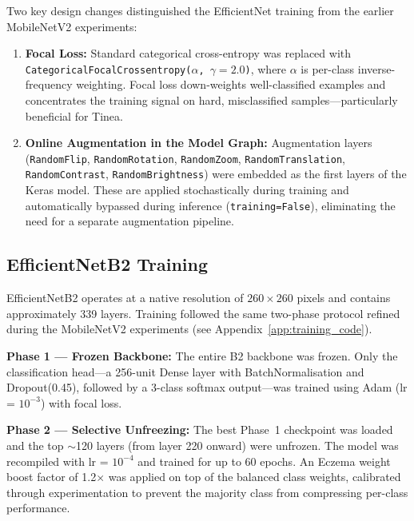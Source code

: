 Two key design changes distinguished the EfficientNet training from the earlier MobileNetV2 experiments:

\begin{enumerate}
    \item \textbf{Focal Loss:} Standard categorical cross-entropy was replaced with \texttt{CategoricalFocalCrossentropy($\alpha$, $\gamma=2.0$)}, where $\alpha$ is per-class inverse-frequency weighting. Focal loss down-weights well-classified examples and concentrates the training signal on hard, misclassified samples---particularly beneficial for Tinea.

    \item \textbf{Online Augmentation in the Model Graph:} Augmentation layers (\texttt{RandomFlip}, \texttt{RandomRotation}, \texttt{RandomZoom}, \texttt{RandomTranslation}, \texttt{RandomContrast}, \texttt{RandomBrightness}) were embedded as the first layers of the Keras model. These are applied stochastically during training and automatically bypassed during inference (\texttt{training=False}), eliminating the need for a separate augmentation pipeline.
\end{enumerate}


\subsection{EfficientNetB2 Training}
\label{sec:b2_training}

EfficientNetB2 operates at a native resolution of $260 \times 260$ pixels and contains approximately 339 layers. Training followed the same two-phase protocol refined during the MobileNetV2 experiments (see Appendix~\ref{app:training_code}).

\textbf{Phase 1 --- Frozen Backbone:} The entire B2 backbone was frozen. Only the classification head---a 256-unit Dense layer with BatchNormalisation and Dropout(0.45), followed by a 3-class softmax output---was trained using Adam (lr = $10^{-3}$) with focal loss.

\textbf{Phase 2 --- Selective Unfreezing:} The best Phase~1 checkpoint was loaded and the top $\sim$120 layers (from layer 220 onward) were unfrozen. The model was recompiled with lr = $10^{-4}$ and trained for up to 60 epochs. An Eczema weight boost factor of 1.2$\times$ was applied on top of the balanced class weights, calibrated through experimentation to prevent the majority class from compressing per-class performance.

